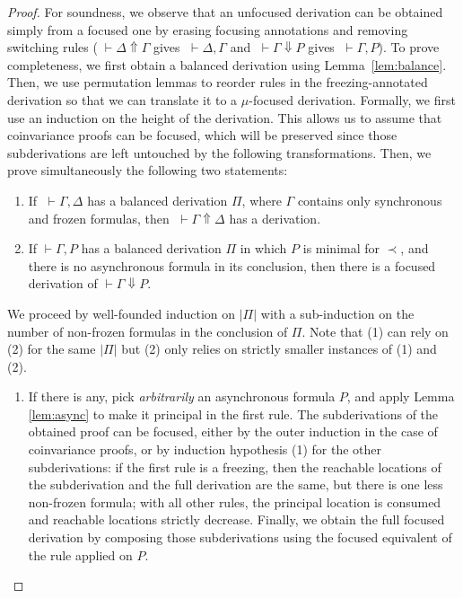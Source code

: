\begin{proof}
For soundness, we observe that an unfocused derivation can be obtained
simply from a focused one by erasing focusing annotations
and removing switching rules
($\;\vdash\Delta\Uparrow\Gamma$ gives $\;\vdash\Delta,\Gamma$ and
 $\;\vdash\Gamma\Downarrow P$ gives $\;\vdash \Gamma,P$).
To prove completeness, we first obtain a balanced derivation using
Lemma~\ref{lem:balance}. Then, we use permutation lemmas to reorder rules
in the freezing-annotated derivation so that we
can translate it to a $\mu$-focused derivation.
Formally, we first use an induction on the height of the derivation.
This allows us to assume that coinvariance proofs can be focused,
which will be preserved since those subderivations are left untouched
by the following transformations.
Then, we prove simultaneously the following two statements:
\begin{enumerate}
\item
  If $\;\vdash\Gamma,\Delta$ has a balanced derivation $\Pi$,
  where $\Gamma$ contains only synchronous and frozen formulas,
  then $\;\vdash\Gamma\Uparrow\Delta$ has a derivation.
\item
  If $\vdash\Gamma,P$ has a balanced derivation $\Pi$
  in which $P$ is minimal for ${\prec}$,
  and there is no asynchronous formula in its conclusion,
  then there is a focused derivation of $\vdash\Gamma\Downarrow P$.
\end{enumerate}
We proceed by well-founded induction on $|\Pi|$
with a sub-induction on the number of non-frozen formulas in the
conclusion of $\Pi$.
Note that (1) can rely on (2) for the same $|\Pi|$ but
(2) only relies on strictly smaller instances of (1) and (2).
\begin{enumerate}
\item
If there is any, pick \emph{arbitrarily} an asynchronous formula $P$,
and apply Lemma \ref{lem:async} to make it principal in the first rule.
The subderivations of the obtained proof can be focused,
either by the outer induction in the case of coinvariance proofs,
or by induction hypothesis (1) for the other subderivations:
if the first rule is a freezing, then the reachable locations of the
subderivation and the full derivation are the same, but there is one
less non-frozen formula;
with all other rules, the principal location is consumed
and reachable locations strictly decrease.
Finally, we obtain the full focused derivation by composing those
subderivations using the focused equivalent of the rule applied on $P$.


\end{enumerate}
\end{proof}
